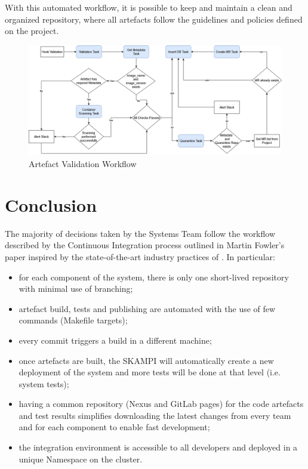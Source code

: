 \documentclass[a4paper,
	       keeplastbox,   %
	       References
	       ]{jacow}
\begin{document}
With this automated workflow, it is possible to keep and maintain a clean and
organized repository, where all artefacts follow the guidelines and policies
defined on the project.

\begin{figure}[!htb]
	\centering
	\includegraphics*[width=0.8\columnwidth]{Artefact-Validation-Workflow}
	\caption{Artefact Validation Workflow}
	\label{fig:Artefact-Validation-Workflow}
\end{figure}

\section{Conclusion}
The majority of decisions taken by the Systems Team follow the workflow described by the Continuous Integration process outlined in Martin Fowler’s paper inspired by the state-of-the-art industry practices of \cite{DevOps, CI, CD}. In particular:

\begin{itemize}
	\setlength\itemsep{0.1em}
    \item for each component of the system, there is only one short-lived repository with minimal use of branching;
    \item artefact build, tests and publishing are automated with the use of few commands (Makefile targets);
    \item every commit triggers a build in a different machine;
    \item once artefacts are built, the SKAMPI will automatically create a new deployment of the system and more tests will be done at that level (i.e. system tests);
    \item having a common repository (Nexus and GitLab pages) for the code artefacts and test results simplifies downloading the latest changes from every team and for each component to enable fast development;
    \item the integration environment is accessible to all developers and deployed in a unique Namespace on the cluster.
\end{itemize}
\end{document}
